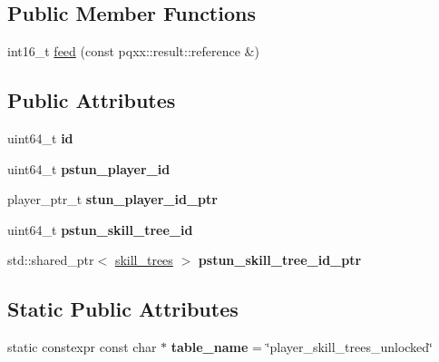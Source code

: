 \subsection*{Public Member Functions}
\begin{DoxyCompactItemize}
\item 
int16\+\_\+t \hyperlink{structmods_1_1orm_1_1player__skill__trees__unlocked_a433aeb4a59fe50b22ffe07593cc70aa5}{feed} (const pqxx\+::result\+::reference \&)
\end{DoxyCompactItemize}
\subsection*{Public Attributes}
\begin{DoxyCompactItemize}
\item 
\mbox{\label{structmods_1_1orm_1_1player__skill__trees__unlocked_a629296c0fe5bc1dea7a34153e131ea8d}} 
uint64\+\_\+t {\bfseries id}
\item 
\mbox{\label{structmods_1_1orm_1_1player__skill__trees__unlocked_ae198e2d48046cb9bb1e104538a5497f4}} 
uint64\+\_\+t {\bfseries pstun\+\_\+player\+\_\+id}
\item 
\mbox{\label{structmods_1_1orm_1_1player__skill__trees__unlocked_ab65d214ed7b898e493feee0d5488fa7c}} 
player\+\_\+ptr\+\_\+t {\bfseries stun\+\_\+player\+\_\+id\+\_\+ptr}
\item 
\mbox{\label{structmods_1_1orm_1_1player__skill__trees__unlocked_a0ee174d34076567d6446ae77d97a2a03}} 
uint64\+\_\+t {\bfseries pstun\+\_\+skill\+\_\+tree\+\_\+id}
\item 
\mbox{\label{structmods_1_1orm_1_1player__skill__trees__unlocked_a9a991dd5bdf40e8cd9d8d36b4317d7f9}} 
std\+::shared\+\_\+ptr$<$ \hyperlink{structmods_1_1orm_1_1skill__trees}{skill\+\_\+trees} $>$ {\bfseries pstun\+\_\+skill\+\_\+tree\+\_\+id\+\_\+ptr}
\end{DoxyCompactItemize}
\subsection*{Static Public Attributes}
\begin{DoxyCompactItemize}
\item 
\mbox{\label{structmods_1_1orm_1_1player__skill__trees__unlocked_a200e9b7026d115140a76a3f8ec0c219a}} 
static constexpr const char $\ast$ {\bfseries table\+\_\+name} = \char`\"{}player\+\_\+skill\+\_\+trees\+\_\+unlocked\char`\"{}
\end{DoxyCompactItemize}
